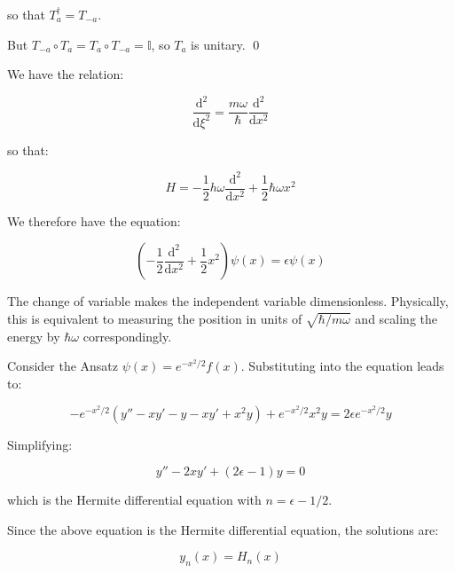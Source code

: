 \documentclass[12pt]{article}
\begin{document}
so that $T_{a}^{\dagger} = T_{-a}$.

But $T_{-a} \circ T_{a} = T_{a} \circ T_{-a} = \mathbb{I}$, so $T_{a}$ is unitary.
\qed



We have the relation:

\begin{equation}
    \frac{\mathrm{d}^{2}}{\mathrm{d}\xi^{2}} = \frac{m\omega}{\hbar} \frac{\mathrm{d}^{2}}{\mathrm{d}x^{2}}
\end{equation}

so that:

\begin{equation}
    H = -\frac{1}{2}h\omega \frac{\mathrm{d}^{2}}{\mathrm{d}x^{2}} + \frac{1}{2} \hbar \omega x^{2}
\end{equation}

We therefore have the equation:

\begin{equation}
    \left( -\frac{1}{2} \frac{\mathrm{d}^{2}}{\mathrm{d}x^{2}} + \frac{1}{2} x^{2} \right) \psi(x) = \epsilon \psi(x)
\end{equation}

The change of variable makes the independent variable dimensionless. Physically, this is equivalent to measuring the position in units of $\sqrt{\hbar / m \omega}$ and scaling the energy by $\hbar \omega$ correspondingly.

Consider the Ansatz $\psi(x) = e^{-x^{2}/2} f(x)$. Substituting into the equation leads to:

\begin{equation}
    -e^{-x^{2}/2} \left( y'' - xy' - y - xy' + x^{2} y \right) + e^{-x^{2}/2} x^{2} y = 2 \epsilon e^{-x^{2}/2} y
\end{equation}

Simplifying:

\begin{equation}
    y'' - 2xy' + (2\epsilon - 1) y = 0
\end{equation}

which is the Hermite differential equation with $n = \epsilon - 1/2$.

Since the above equation is the Hermite differential equation, the solutions are:

\begin{equation}
    y_{n}(x) = H_{n}(x)
\end{equation}
\end{document}
